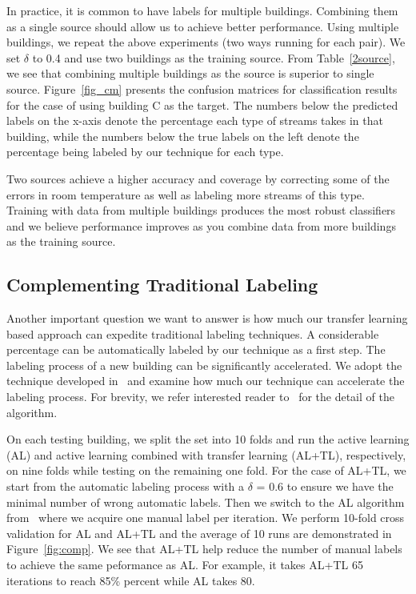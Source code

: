 In practice, it is common to have labels for multiple buildings.  Combining them as a single source should allow us to achieve better performance.
Using multiple buildings, we repeat the above experiments (two ways running for each pair).
We set $\delta$ to 0.4 and use two buildings as the training source. %
From Table~\ref{2source}, we see that combining multiple buildings as the source is superior to single source.  %
Figure~\ref{fig_cm} presents the confusion matrices for classification results for the case of using building C as the target.
The numbers below the predicted labels on the x-axis denote the percentage each type of streams takes in that building, while the numbers below the true labels on the left denote the percentage being labeled by our technique for each type.

Two sources achieve a higher accuracy and coverage by correcting some of the errors in room temperature as well as labeling more streams of this type.
Training with data from multiple buildings produces the most robust classifiers and we believe performance improves as you combine data from more
buildings as the training source.


\subsection{Complementing Traditional Labeling}
Another important question we want to answer is how much our transfer learning based approach can expedite traditional labeling techniques. 
A considerable percentage can be automatically labeled by our technique as a first step. The labeling process of a new building can be significantly accelerated.
We adopt the technique developed in~\cite{cikm} and examine how much our technique can accelerate the labeling process.
For brevity, we refer interested reader to~\cite{cikm} for the detail of the algorithm.

On each testing building, we split the set into 10 folds and run the active learning (AL) and active learning combined with transfer learning (AL+TL), respectively, on nine folds while testing on the remaining one fold.
For the case of AL+TL, we start from the automatic labeling process with a $\delta$ = 0.6 to ensure we have the minimal number of wrong automatic labels. Then we switch to the AL algorithm from~\cite{cikm} where we acquire one manual label per iteration.
We perform 10-fold cross validation for AL and AL+TL and the average of 10 runs are demonstrated in Figure~\ref{fig:comp}. We see that AL+TL help reduce the number of manual labels to achieve the same peformance as AL.
For example, it takes AL+TL 65 iterations to reach 85\% percent while AL takes 80.


